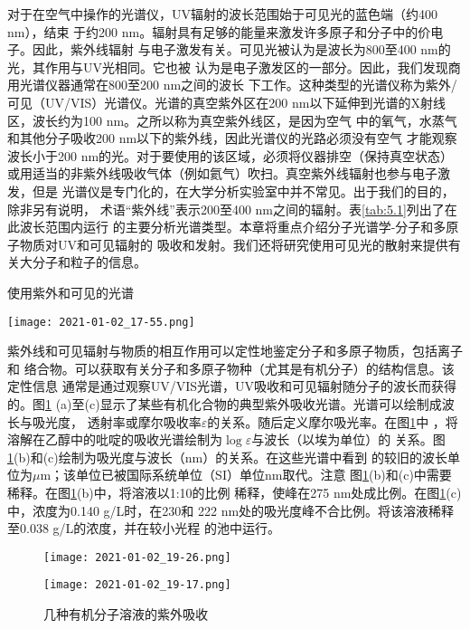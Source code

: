 对于在空气中操作的光谱仪，UV辐射的波长范围始于可见光的蓝色端（约400 nm），结束
于约200 nm。辐射具有足够的能量来激发许多原子和分子中的价电子。因此，紫外线辐射
与电子激发有关。可见光被认为是波长为800至400 nm的光，其作用与UV光相同。它也被
认为是电子激发区的一部分。因此，我们发现商用光谱仪器通常在800至200 nm之间的波长
下工作。这种类型的光谱仪称为紫外/可见（UV/VIS）光谱仪。光谱的真空紫外区在200 
nm以下延伸到光谱的X射线区，波长约为100 nm。之所以称为真空紫外线区，是因为空气
中的氧气，水蒸气和其他分子吸收200 nm以下的紫外线，因此光谱仪的光路必须没有空气
才能观察波长小于200 nm的光。对于要使用的该区域，必须将仪器排空（保持真空状态）
或用适当的非紫外线吸收气体（例如氦气）吹扫。真空紫外线辐射也参与电子激发，但是
光谱仪是专门化的，在大学分析实验室中并不常见。出于我们的目的，除非另有说明，
术语“紫外线”表示200至400 nm之间的辐射。表\ref{tab:5.1}列出了在此波长范围内运行
的主要分析光谱类型。本章将重点介绍分子光谱学-分子和多原子物质对UV和可见辐射的
吸收和发射。我们还将研究使用可见光的散射来提供有关大分子和粒子的信息。
\begin{table}[htbp]
    \centering
    \caption{使用紫外和可见的光谱}
    \label{tab:5.1}
    \texttt{[image: 2021-01-02\_17-55.png]}
\end{table}
紫外线和可见辐射与物质的相互作用可以定性地鉴定分子和多原子物质，包括离子和
络合物。可以获取有关分子和多原子物种（尤其是有机分子）的结构信息。该定性信息
通常是通过观察UV/VIS光谱，UV吸收和可见辐射随分子的波长而获得的。图\ref{fig:5.1}
(a)至(c)显示了某些有机化合物的典型紫外吸收光谱。光谱可以绘制成波长与吸光度，
透射率或摩尔吸收率$\varepsilon$的关系。随后定义摩尔吸光率。在图\ref{fig:5.1}中
，将溶解在乙醇中的吡啶的吸收光谱绘制为$\log\varepsilon$与波长（以埃为单位）的
关系。图\ref{fig:5.1}(b)和(c)绘制为吸光度与波长（nm）的关系。在这些光谱中看到
的较旧的波长单位为$\mu$m；该单位已被国际系统单位（SI）单位nm取代。注意
图\ref{fig:5.1}(b)和(c)中需要稀释。在图\ref{fig:5.1}(b)中，将溶液以1:10的比例
稀释，使峰在275 nm处成比例。在图\ref{fig:5.1}(c)中，浓度为0.140 g/L时，在230和
222 nm处的吸光度峰不合比例。将该溶液稀释至0.038 g/L的浓度，并在较小光程
的池中运行。

\begin{figure}[htpb]
    \centering
    \texttt{[image: 2021-01-02\_19-26.png]}
\end{figure}
\begin{figure}[htpb]
    \centering
    \texttt{[image: 2021-01-02\_19-17.png]}
    \caption{几种有机分子溶液的紫外吸收}
    \label{fig:5.1}
\end{figure}

